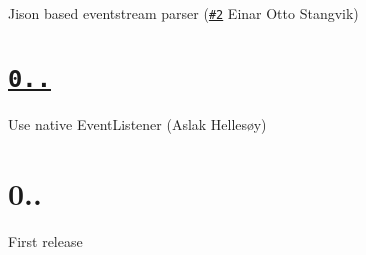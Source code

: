 \begin{DoxyItemize}
\item Jison based eventstream parser (\href{https://github.com/aslakhellesoy/eventsource-node/pull/2}{\tt \#2} Einar Otto Stangvik)
\end{DoxyItemize}

\section*{\href{https://github.com/aslakhellesoy/eventsource-node/compare/v0.0.1...v0.0.2}{\tt 0..}}


\begin{DoxyItemize}
\item Use native Event\+Listener (Aslak Hellesøy)
\end{DoxyItemize}

\section*{0..}


\begin{DoxyItemize}
\item First release 
\end{DoxyItemize}